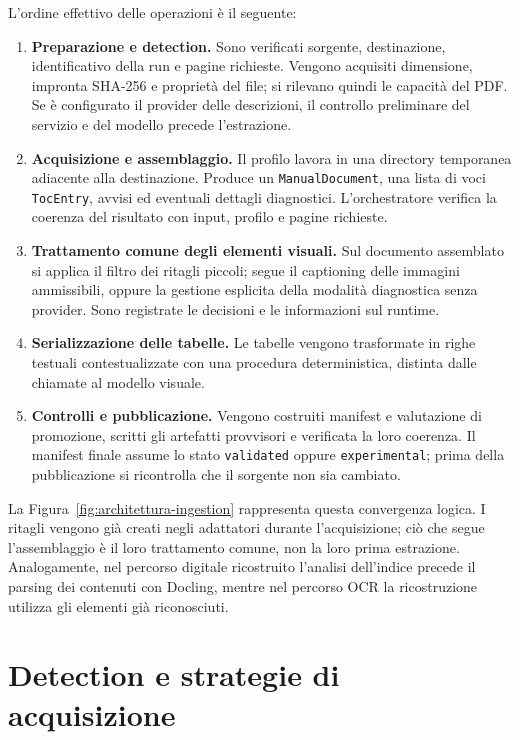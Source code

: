 L'ordine effettivo delle operazioni è il seguente:
\begin{enumerate}
    \item \textbf{Preparazione e detection.} Sono verificati sorgente, destinazione, identificativo della run e pagine richieste. Vengono acquisiti dimensione, impronta SHA-256 e proprietà del file; si rilevano quindi le capacità del PDF. Se è configurato il provider delle descrizioni, il controllo preliminare del servizio e del modello precede l'estrazione.
    \item \textbf{Acquisizione e assemblaggio.} Il profilo lavora in una directory temporanea adiacente alla destinazione. Produce un \texttt{ManualDocument}, una lista di voci \texttt{TocEntry}, avvisi ed eventuali dettagli diagnostici. L'orchestratore verifica la coerenza del risultato con input, profilo e pagine richieste.
    \item \textbf{Trattamento comune degli elementi visuali.} Sul documento assemblato si applica il filtro dei ritagli piccoli; segue il captioning delle immagini ammissibili, oppure la gestione esplicita della modalità diagnostica senza provider. Sono registrate le decisioni e le informazioni sul runtime.
    \item \textbf{Serializzazione delle tabelle.} Le tabelle vengono trasformate in righe testuali contestualizzate con una procedura deterministica, distinta dalle chiamate al modello visuale.
    \item \textbf{Controlli e pubblicazione.} Vengono costruiti manifest e valutazione di promozione, scritti gli artefatti provvisori e verificata la loro coerenza. Il manifest finale assume lo stato \texttt{validated} oppure \texttt{experimental}; prima della pubblicazione si ricontrolla che il sorgente non sia cambiato.
\end{enumerate}

La Figura~\ref{fig:architettura-ingestion} rappresenta questa convergenza logica. I ritagli vengono già creati negli adattatori durante l'acquisizione; ciò che segue l'assemblaggio è il loro trattamento comune, non la loro prima estrazione. Analogamente, nel percorso digitale ricostruito l'analisi dell'indice precede il parsing dei contenuti con Docling, mentre nel percorso OCR la ricostruzione utilizza gli elementi già riconosciuti.



\section{Detection e strategie di acquisizione}
\label{sec:profili}


